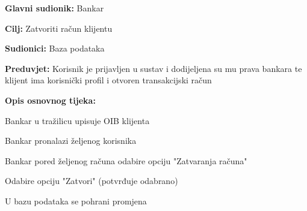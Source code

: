                 
                \noindent {}
                \begin{packed_item}
                
                  \item \textbf{Glavni sudionik: }Bankar
                  \item  \textbf{Cilj:} Zatvoriti račun klijentu
                  \item  \textbf{Sudionici:} Baza podataka
                  \item  \textbf{Preduvjet:} Korisnik je prijavljen u sustav i dodijeljena su mu prava bankara te klijent ima korisnički profil i otvoren transakcijski račun
                  \item  \textbf{Opis osnovnog tijeka:}
                  
                  \item[] \begin{packed_enum}
                
                	\item Bankar u tražilicu upisuje OIB klijenta
                	\item Bankar pronalazi željenog korisnika
                    \item Bankar pored željenog računa odabire opciju "Zatvaranja računa"
                    \item Odabire opciju "Zatvori" (potvrđuje odabrano)                  
                    \item U bazu podataka se pohrani promjena
                  \end{packed_enum}
                 
                \end{packed_item}
            

